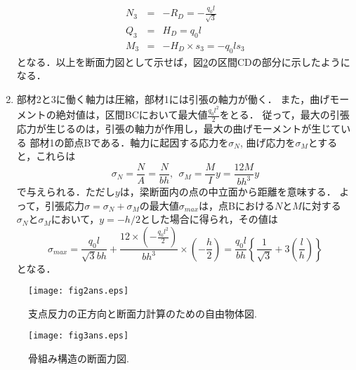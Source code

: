 ﻿\documentclass[10pt,a4j]{jarticle}
\begin{document}
\begin{enumerate}
\begin{eqnarray}
	N_3 &=&-R_D= -\frac{q_0l}{\sqrt{3}} \\
	Q_3 &=&H_D=q_0l \\
	M_3 &=& -H_D\times s_3=-q_0ls_3
\end{eqnarray}
となる．以上を断面力図として示せば，図\ref{fig:fig3}の区間CDの部分に示したようになる．
\item
部材2と3に働く軸力は圧縮，部材1には引張の軸力が働く．
また，曲げモーメントの絶対値は，区間BCにおいて最大値$\frac{q_0l^2}{2}$をとる．
従って，最大の引張応力が生じるのは，引張の軸力が作用し，最大の曲げモーメントが生じている
部材1の節点Bである．軸力に起因する応力を$\sigma_N$, 曲げ応力を$\sigma_M$とすると，これらは
\begin{equation}
	\sigma_N=\frac{N}{A}=\frac{N}{bh}, \ \
	\sigma_M=\frac{M}{I}y=\frac{12M}{bh^3}y
	\label{eqn:}
\end{equation}
で与えられる．ただし$y$は，梁断面内の点の中立面から距離を意味する．
よって，引張応力$\sigma=\sigma_N+\sigma_M$の最大値$\sigma_{max}$は，点Bにおける$N$と$M$に対する
$\sigma_N$と$\sigma_M$において，$y=-h/2$とした場合に得られ，その値は
\begin{equation}
	\sigma_{max}=
	\frac{q_0l}{\sqrt{3} bh} + 
	\frac{12\times\left(-\frac{q_0l^2}{2}\right)}{bh^3}\times\left(-\frac{h}{2}\right)
	=\frac{q_0l}{bh}\left\{\frac{1}{\sqrt{3}}+3\left(\frac{l}{h}\right)\right\}
	\label{eqn:}
\end{equation}
となる．
\end{enumerate}
\begin{figure}[h]
	\begin{center}
	\texttt{[image: fig2ans.eps]} 
	\end{center}
	\caption{支点反力の正方向と断面力計算のための自由物体図.} 
	\label{fig:fig2}
\end{figure}
\begin{figure}[h]
	\begin{center}
	\texttt{[image: fig3ans.eps]} 
	\end{center}
	\caption{骨組み構造の断面力図.} 
	\label{fig:fig3}
\end{figure}
\end{document}

